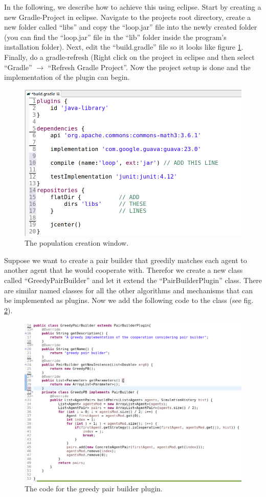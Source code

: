 \documentclass[parskip=full,11pt]{scrartcl}
\begin{document}
In the following, we describe how to achieve this using eclipse. Start by creating a new Gradle-Project in eclipse. Navigate to the projects root directory, create a new folder called \enquote{libs} and copy the \enquote{loop.jar} file into the newly created folder (you can find the \enquote{loop.jar} file in the \enquote{lib} folder inside the program's installation folder). Next, edit the \enquote{build.gradle} file so it looks like figure \ref{fig:build_gradle}. Finally, do a gradle-refresh (Right click on the project in eclipse and then select \enquote{Gradle} \(\rightarrow\) \enquote{Refresh Gradle Project}. Now the project setup is done and the implementation of the plugin can begin.

\begin{figure} [hbt]
	\centering
	\includegraphics[width=0.8\linewidth]{img_manual/edit_gradle.png}
	\caption{The population creation window.}
	\label{fig:build_gradle}
\end{figure}

Suppose we want to create a pair builder that greedily matches each agent to another agent that he would cooperate with. Therefor we create a new class called \enquote{GreedyPairBuilder} and let it extend the \enquote{PairBuilderPlugin} class. There are similar named classes for all the other algorithms and mechanisms that can be implemented as plugins. Now we add the following code to the class (see fig. \ref{fig:impl}).

\begin{figure} [hbt]
	\centering
	\includegraphics[width=0.9\linewidth]{img_manual/implementation.png}
	\caption{The code for the greedy pair builder plugin.}
	\label{fig:impl}
\end{figure}
\end{document}
